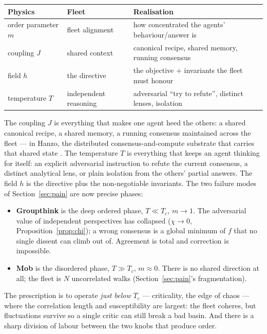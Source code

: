 \documentclass[11pt]{article}
\begin{document}
\begin{center}
\begin{tabular}{@{}lll@{}}
\toprule
\textbf{Physics} & \textbf{Fleet} & \textbf{Realisation} \\
\midrule
order parameter $m$ & fleet alignment & how concentrated the agents' behaviour/answer is \\
coupling $J$ & shared context & canonical recipe, shared memory, running consensus \\
field $h$ & the directive & the objective $+$ invariants the fleet must honour \\
temperature $T$ & independent reasoning & adversarial ``try to refute'', distinct lenses, isolation \\
\bottomrule
\end{tabular}
\end{center}

The coupling $J$ is everything that makes one agent heed the others: a shared canonical recipe, a shared memory,
a running consensus maintained across the fleet --- in Hanzo, the distributed consensus-and-compute substrate
that carries that shared state \cite{hanzo-consensus-zap-compute}. The temperature $T$ is everything that keeps
an agent thinking for itself: an explicit adversarial instruction to refute the current consensus, a distinct
analytical lens, or plain isolation from the others' partial answers. The field $h$ is the directive plus the
non-negotiable invariants. The two failure modes of Section~\ref{sec:pain} are now precise phases:

\begin{itemize}[leftmargin=1.4em,itemsep=2pt]
\item \textbf{Groupthink} is the deep ordered phase, $T\ll T_c$, $m\to1$. The adversarial value of independent
perspectives has collapsed ($\chi\to0$, Proposition~\ref{prop:chi}); a wrong consensus is a global minimum of
$f$ that no single dissent can climb out of. Agreement is total and correction is impossible.
\item \textbf{Mob} is the disordered phase, $T\gg T_c$, $m\approx0$. There is no shared direction at all; the
fleet is $N$ uncorrelated walks (Section~\ref{sec:pain}'s fragmentation).
\end{itemize}

The prescription is to operate \emph{just below} $T_c$ --- criticality, the edge of chaos --- where the
correlation length and susceptibility are largest: the fleet coheres, but fluctuations survive so a single
critic can still break a bad basin. And there is a sharp division of labour between the two knobs that produce
order.
\end{document}
